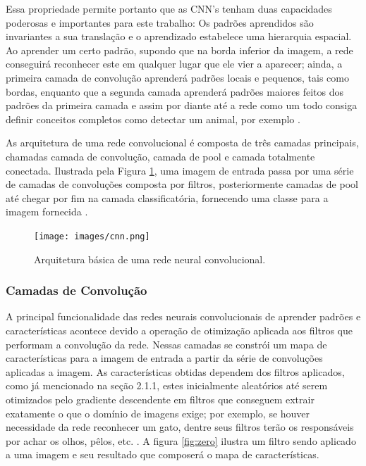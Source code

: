 \documentclass[12pt]{report}
\begin{document}
Essa propriedade permite portanto que as \ac{CNN}'s tenham duas capacidades poderosas e importantes para este trabalho: Os padrões aprendidos são invariantes a sua translação e o aprendizado estabelece uma hierarquia espacial. Ao aprender um certo padrão, supondo que na borda inferior da imagem, a rede conseguirá reconhecer este em qualquer lugar que ele vier a aparecer; ainda, a primeira camada de convolução aprenderá padrões locais e pequenos, tais como bordas, enquanto que a segunda camada aprenderá padrões maiores feitos dos padrões da primeira camada e assim por diante até a rede como um todo consiga definir conceitos completos como detectar um animal, por exemplo \cite{chollet}.

As arquitetura de uma rede convolucional é composta de três camadas principais, chamadas camada de convolução, camada de pool e camada totalmente conectada. Ilustrada pela Figura \ref{fig:passaro}, uma imagem de entrada passa por uma série de camadas de convoluções composta por filtros, posteriormente camadas de pool até chegar por fim na camada classificatória, fornecendo uma classe para a imagem fornecida \cite{chollet}.

\begin{figure}
    \centering
    \texttt{[image: images/cnn.png]}
    \caption{Arquitetura básica de uma rede neural convolucional.}
    \label{fig:passaro}
\end{figure}

\subsubsection{Camadas de Convolução}

A principal funcionalidade das redes neurais convolucionais de aprender padrões e características acontece devido a operação de otimização aplicada aos filtros que performam a convolução da rede. Nessas camadas se constrói um mapa de características para a imagem de entrada a partir da série de convoluções aplicadas a imagem. As características obtidas dependem dos filtros aplicados, como já mencionado na seção 2.1.1, estes inicialmente aleatórios até serem otimizados pelo gradiente descendente em filtros que conseguem extrair exatamente o que o domínio de imagens exige; por exemplo, se houver necessidade da rede reconhecer um gato, dentre seus filtros terão os responsáveis por achar os olhos, pêlos, etc. \cite{chollet}. A figura \ref{fig:zero} ilustra um filtro sendo aplicado a uma imagem e seu resultado que composerá o mapa de características. 
\end{document}
